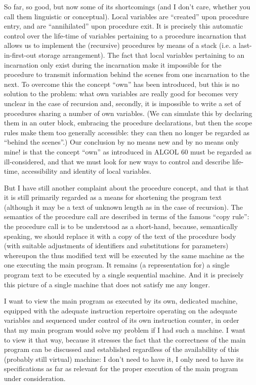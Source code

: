 So far, so good, but now some of its shortcomings (and I don't care, whether you call them linguistic or conceptual). Local variables are ``created'' upon procedure entry, and are ``annihilated'' upon procedure exit. It is precisely this automatic control over the life-time of variables pertaining to a procedure incarnation that allows us to implement the (recursive) procedures by means of a stack (i.e. a last-in-first-out storage arrangement). The fact that local variables pertaining to an incarnation only exist during the incarnation make it impossible for the procedure to transmit information behind the scenes from one incarnation to the next. To overcome this the concept ``own'' has been introduced, but this is no solution to the problem: what own variables are really good for becomes very unclear in the case of recursion and, secondly, it is impossible to write a set of procedures sharing a number of own variables. (We can simulate this by declaring them in an outer block, embracing the procedure declarations, but then the scope rules make them too generally accessible: they can then no longer be regarded as ``behind the scenes''.) Our conclusion \textemdash{}  by no means new and by no means only mine! \textemdash{}  is that the concept ``own'' as introduced in ALGOL 60 must be regarded as ill-considered, and that we must look for new ways to control and describe life-time, accessibility and identity of local variables.

But I have still another complaint about the procedure concept, and that is that it is still primarily regarded as a means for shortening the program text (although it may be a text of unknown length as in the case of recursion). The semantics of the procedure call are described in terms of the famous ``copy rule'': the procedure call is to be understood as a short-hand, because, semantically speaking, we should replace it with a copy of the text of the procedure body (with suitable adjustments of identifiers and substitutions for parameters) whereupon the thus modified text will be executed by the same machine as the one executing the main program. It remains (a representation for) a single program text to be executed by a single sequential machine. And it is precisely this picture of a single machine that does not satisfy me any longer.

I want to view the main program as executed by its own, dedicated machine, equipped with the adequate instruction repertoire operating on the adequate variables and sequenced under control of its own instruction counter, in order that my main program would solve my problem if I had such a machine. I want to view it that way, because it stresses the fact that  the correctness of the main program can be discussed and established regardless of the availability of this (probably still virtual) machine: I don't
need to have it, I only need to have its specifications as far as relevant for the proper execution of the main program under consideration.

